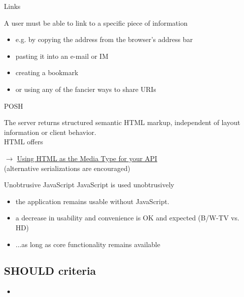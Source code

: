 \documentclass{beamer}
\begin{document}
\begin{frame}{Links}

  A user must be able to link to a specific piece of information

  \begin{itemize}
    \item e.g. by copying the address from the browser's address bar
    \item pasting it into an e-mail or IM
    \item creating a bookmark
    \item or using any of the fancier ways to share URIs
  \end{itemize}
\end{frame}

\begin{frame}{POSH}

  The server returns structured semantic HTML markup, independent of layout information or client behavior.
  \\

  HTML offers 

  \ensuremath{\rightarrow}
  \href{http://codeartisan.blogspot.de/2012/07/using-html-as-media-type-for-your-api.html}{Using HTML as the Media Type for your API}
  \\

  (alternative serializations are encouraged)

\end{frame}

\begin{frame}{Unobtrusive JavaScript}
  JavaScript is used unobtrusively

  \begin{itemize}
    \item the application remains usable without JavaScript.
    \item a decrease in usability and convenience is OK and expected (B/W-TV vs. HD)
    \item ...as long as core functionality remains available
  \end{itemize}
\end{frame}

\subsection{SHOULD criteria}

\begin{frame}{}

  \begin{itemize}
    \item
  \end{itemize}
\end{frame}
\end{document}
